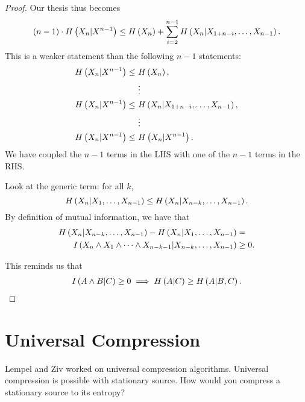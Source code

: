 \begin{proof}
	Our thesis thus becomes
	\begin{equation*}
		(n-1) \cdot H\left({X_n | X^{n-1}}\right)
		\le
		H\left({X_n}\right) + \sum_{i=2}^{n-1} H\left({X_n | X_{1+n-i}, \dots, X_{n-1}}\right).
	\end{equation*}
	This is a weaker statement than the following $n-1$ statements:
	\begin{align*}
		H\left({X_n | X^{n-1}}\right) \le~& H\left({X_n}\right),
		\\
		& \vdots
		\\
		H\left({X_n | X^{n-1}}\right) \le~& H\left({X_n | X_{1+n-i}, \dots, X_{n-1}}\right),
		\\
		& \vdots
		\\
		H\left({X_n | X^{n-1}}\right) \le~& H\left({X_n | X^{n-1}}\right).
	\end{align*}
	We have coupled the $n-1$ terms in the \ac{LHS} with one of the $n-1$ terms in the \ac{RHS}.

	Look at the generic term: for all $k$,
	\begin{equation*}
		H\left({X_n | X_1, \dots, X_{n-1}}\right)
		\le
		H\left({X_n | X_{n-k}, \dots, X_{n-1}}\right).
	\end{equation*}
	By definition of mutual information, we have that
	\begin{align*}
		H\left({X_n | X_{n-k}, \dots, X_{n-1}}\right)
		-
		H\left({X_n | X_1, \dots, X_{n-1}}\right)
		& =
		\\
		I \left( {X_n \land X_1 \land \dots \land X_{n-k-1} | X_{n-k}, \dots, X_{n-1}} \right)
		& \ge 0. \qedhere
	\end{align*}

	This reminds us that
	\begin{align*}
		I \left( {A \land B | C} \right) \ge 0
		\implies
		H\left({A | C}\right) \ge H\left({A | B, C}\right).
	\end{align*}
\end{proof}

\section{Universal Compression}

Lempel and Ziv worked on universal compression algorithms.
Universal compression is possible with stationary source.
How would you compress a stationary source to its entropy?

